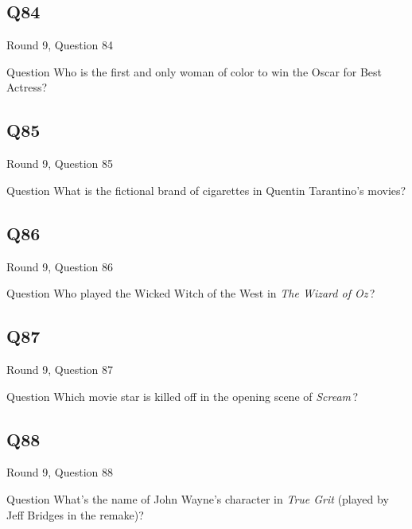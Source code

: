 \documentclass[11pt]{beamer}
\begin{document}
\subsection*{Q84}
\begin{frame}[t]{Round 9, Question 84}
\vspace{2em}
\begin{block}{Question}
Who is the first and only woman of color to win the Oscar for Best Actress?
\end{block}
\end{frame}
    

\subsection*{Q85}
\begin{frame}[t]{Round 9, Question 85}
\vspace{2em}
\begin{block}{Question}
What is the fictional brand of cigarettes in Quentin Tarantino's movies?
\end{block}
\end{frame}
    

\subsection*{Q86}
\begin{frame}[t]{Round 9, Question 86}
\vspace{2em}
\begin{block}{Question}
Who played the Wicked Witch of the West in \emph{The Wizard of Oz}\,?
\end{block}
\end{frame}
    

\subsection*{Q87}
\begin{frame}[t]{Round 9, Question 87}
\vspace{2em}
\begin{block}{Question}
Which movie star is killed off in the opening scene of \emph{Scream}\,?
\end{block}
\end{frame}
    

\subsection*{Q88}
\begin{frame}[t]{Round 9, Question 88}
\vspace{2em}
\begin{block}{Question}
What's the name of John Wayne's character in \emph{True Grit} (played by Jeff Bridges in the remake)?
\end{block}
\end{frame}
    
\end{document}

